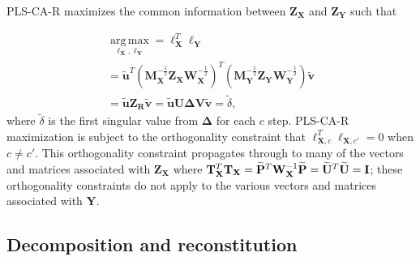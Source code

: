 \documentclass[12pt]{article}
\begin{document}
PLS-CA-R maximizes the common information between
\({\mathbf Z}_{\mathbf X}\) and \({\mathbf Z}_{\mathbf Y}\) such that

\begin{equation}
\begin{aligned}
\underset{{\boldsymbol \ell}_{\mathbf X},{\boldsymbol \ell}_{\mathbf Y}}{\operatorname{arg\,max}} = {\boldsymbol \ell}_{\mathbf X}^{T}{\boldsymbol \ell}_{\mathbf Y} \\ 
= \widetilde{\mathbf u}^{T}({\mathbf M}_{\mathbf X}^{-\frac{1}{2}}{\mathbf Z}_{\mathbf X}{\mathbf W}_{\mathbf X}^{-\frac{1}{2}})^{T}({\mathbf M}_{\mathbf Y}^{-\frac{1}{2}}{\mathbf Z}_{\mathbf Y}{\mathbf W}_{\mathbf Y}^{-\frac{1}{2}})\widetilde{\mathbf v} \\ 
= \widetilde{\mathbf u}{\mathbf Z}_{\mathbf R}\widetilde{\mathbf v} = \widetilde{\mathbf u}{\mathbf U}{\boldsymbol \Delta}{\mathbf V}\widetilde{\mathbf v} = \widetilde\delta,
\end{aligned}
\end{equation} where \(\widetilde\delta\) is the first singular value
from \({\mathbf \Delta}\) for each \(c\) step. PLS-CA-R maximization is
subject to the orthogonality constraint that
\({\boldsymbol \ell}_{{\mathbf X},c}^{T}{\boldsymbol \ell}_{{\mathbf X},c'} = 0\)
when \(c \neq c'\). This orthogonality constraint propagates through to
many of the vectors and matrices associated with
\({\mathbf Z}_{\mathbf X}\) where
\({\mathbf T}_{\mathbf X}^{T}{\mathbf T}_{\mathbf X} = \widetilde{\mathbf P}^{T}{\mathbf W}_{\bf X}^{-1}\widetilde{\mathbf P} = \widetilde{\mathbf U}^{T}\widetilde{\mathbf U} = {\mathbf I}\);
these orthogonality constraints do not apply to the various vectors and
matrices associated with \({\mathbf Y}\).

\hypertarget{decomposition-and-reconstitution}{%
\subsection{Decomposition and
reconstitution}\label{decomposition-and-reconstitution}}

\label{section:recresp}
\end{document}
